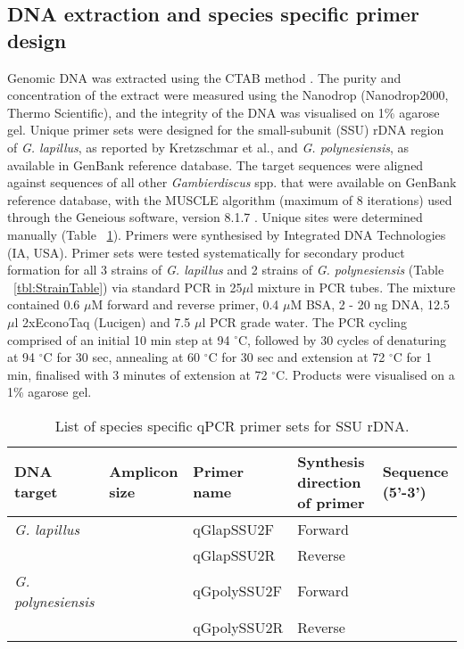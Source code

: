 \documentclass[12pt]{article}
\begin{document}
\subsection*{DNA extraction and species specific primer design}
Genomic DNA was extracted using the CTAB method \citep{zhou1999analysis}. The purity and concentration of the extract were measured using the Nanodrop (Nanodrop2000, Thermo Scientific), and the integrity of the DNA was visualised on 1\% agarose gel.
Unique primer sets were designed for the small-subunit (SSU) rDNA region of \emph{G. lapillus}, as reported by Kretzschmar et al., and \emph{G. polynesiensis}, as available in GenBank reference database. The target sequences were aligned against sequences of all other \emph{Gambierdiscus} spp. that were available on GenBank reference database, with the MUSCLE algorithm (maximum of 8 iterations) \citep{edgar2004muscle} used through the Geneious software, version 8.1.7 \citep{kearse2012geneious}. Unique sites were determined manually (Table ~\ref{tbl:PrimerTable}). Primers were synthesised by Integrated DNA Technologies (IA, USA).
Primer sets were tested systematically for secondary product formation for all 3 strains of \emph{G. lapillus} and 2 strains of \emph{G. polynesiensis} (Table ~\ref{tbl:StrainTable}) via standard PCR in 25$\mu$l mixture in PCR tubes. The mixture contained 0.6 $\mu$M forward and reverse primer, 0.4 $\mu$M BSA, 2 - 20 ng DNA, 12.5 $\mu$l 2xEconoTaq (Lucigen) and 7.5 $\mu$l PCR grade water.
The PCR cycling comprised of an initial 10 min step at 94 $^{\circ}$C, followed by 30 cycles of denaturing at 94 $^{\circ}$C for 30 sec, annealing at 60 $^{\circ}$C for 30 sec and extension at 72 $^{\circ}$C for 1 min, finalised with 3 minutes of extension at 72 $^{\circ}$C. Products were visualised on a 1\% agarose gel.
\FloatBarrier
\begin{table}
\caption{List of species specific qPCR primer sets for SSU rDNA.}
\label{tbl:PrimerTable}
\begin{tabular}{ | p{2cm} | p{2cm} | p{2cm} | p{2cm} | p{7cm} | }
\hline
\textbf{DNA target} & \textbf{Amplicon size} & \textbf{Primer name} & \textbf{Synthesis direction of primer} & \textbf{Sequence (5'-3')} \\
\hline
\emph{G. lapillus} & &qGlapSSU2F & Forward & \\
\hline
& &qGlapSSU2R & Reverse & \\
\hline
\emph{G. polynesiensis}& &qGpolySSU2F& Forward & \\
\hline
& &qGpolySSU2R & Reverse & \\
\hline
\end{tabular}
\end{table}
\end{document}

